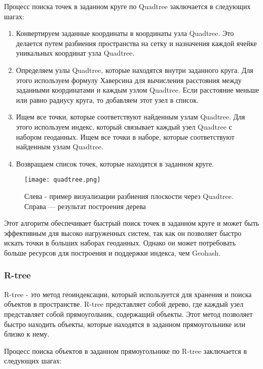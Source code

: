 Процесс поиска точек в заданном круге по Quadtree заключается в следующих шагах:
\begin{enumerate}
    \item Конвертируем заданные координаты в координаты узла Quadtree. Это делается путем разбиения пространства на сетку и назначения каждой ячейке уникальных координат узла Quadtree.
    \item Определяем узлы Quadtree, которые находятся внутри заданного круга. Для этого используем формулу Хаверсина для вычисления расстояния между заданными координатами и каждым узлом Quadtree. Если расстояние меньше или равно радиусу круга, то добавляем этот узел в список.
    \item Ищем все точки, которые соответствуют найденным узлам Quadtree. Для этого используем индекс, который связывает каждый узел Quadtree с набором геоданных. Ищем все точки в наборе, которые соответствуют найденным узлам Quadtree.
    \item Возвращаем список точек, которые находятся в заданном круге.
\end{enumerate}

\begin{figure}[h]
    \centering
    \texttt{[image: quadtree.png]}
    \caption{Слева - пример визуализации разбиения плоскости через Quadtree. Справа — результат построения дерева}
\end{figure}

Этот алгоритм обеспечивает быстрый поиск точек в заданном круге и может быть эффективным для высоко нагруженных систем, так как он позволяет быстро искать точки в больших наборах геоданных. Однако он может потребовать больше ресурсов для построения и поддержки индекса, чем Geohash.

\subsubsection{R-tree}
R-tree - это метод геоиндексации, который используется для хранения и поиска объектов в пространстве. R-tree представляет собой дерево, где каждый узел представляет собой прямоугольник, содержащий объекты. Этот метод позволяет быстро находить объекты, которые находятся в заданном прямоугольнике или близко к нему.

Процесс поиска объектов в заданном прямоугольнике по R-tree заключается в следующих шагах:

